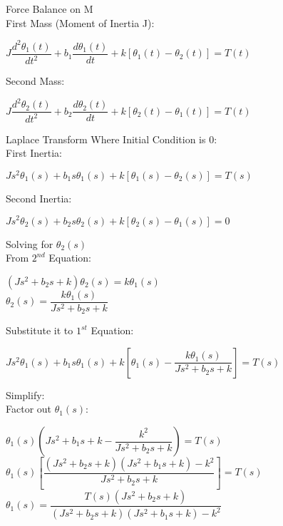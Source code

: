 \documentclass[11pt,letterpaper]{article}
\begin{document}
Force Balance on M\\[12pt]
First Mass (Moment of Inertia J):\\
\begin{center}
	$J\dfrac{d^2\theta_1(t)}{dt^2}+b_1\dfrac{d\theta_1(t)}{dt}+k[\theta_1(t)-\theta_2(t)]=T(t)$\\
\end{center}
Second Mass:\\
\begin{center}
	$J\dfrac{d^2\theta_2(t)}{dt^2}+b_2\dfrac{d\theta_2(t)}{dt}+k[\theta_2(t)-\theta_1(t)]=T(t)$\\
\end{center}
Laplace Transform Where Initial Condition is $0$:\\[12pt]
First Inertia:\\
\begin{center}
	$Js^2\theta_1(s)+b_1s\theta_1(s)+k[\theta_1(s)-\theta_2(s)]=T(s)$\\
\end{center}
Second Inertia:\\
\begin{center}
	$Js^2\theta_2(s)+b_2s\theta_2(s)+k[\theta_2(s)-\theta_1(s)]=0$\\
\end{center}
Solving for $\theta_2(s)$\\[12pt]
From $2^{nd}$ Equation:\\
\begin{center}
	$(Js^2+b_2s+k)\theta_2(s)=k\theta_1(s)$\\[12pt]
	$\theta_2(s)=\dfrac{k\theta_1(s)}{Js^2+b_2s+k}$\\
\end{center}
Substitute it to $1^{st}$ Equation:\\
\begin{center}
	$Js^2\theta_1(s)+b_1s\theta_1(s)+k[\theta_1(s)-\dfrac{k\theta_1(s)}{Js^2+b_2s+k}]=T(s)$\\
\end{center}
Simplify:\\[12pt]
Factor out $\theta_1(s)$:\\
\begin{center}
	$\theta_1(s)\left(Js^2+b_1s+k-\dfrac{k^2}{Js^2+b_2s+k}\right)=T(s) $\\[12pt]
	$\theta_1(s)\left[\dfrac{(Js^2+b_2s+k)(Js^2+b_1s+k)-k^2}{Js^2+b_2s+k}\right]=T(s) $\\[12pt]
	$\theta_1(s)=\dfrac{T(s)(Js^2+b_2s+k)}{(Js^2+b_2s+k)(Js^2+b_1s+k)-k^2} $\\[12pt]
\end{center}
\end{document}
